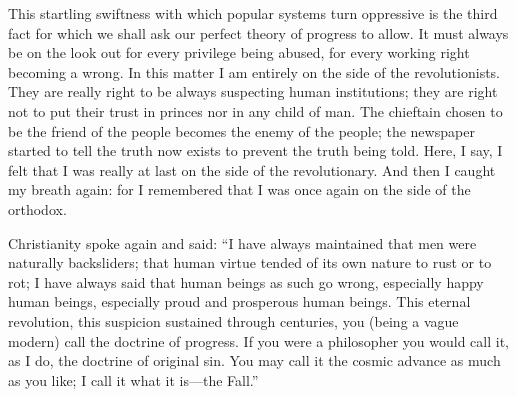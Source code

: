 This startling swiftness with which popular systems turn oppressive is the third fact for which we shall ask our perfect theory of progress to allow. It must always be on the look out for every privilege being abused, for every working right becoming a wrong. In this matter I am entirely on the side of the revolutionists. They are really right to be always suspecting human institutions; they are right not to put their trust in princes nor in any child of man. The chieftain chosen to be the friend of the people becomes the enemy of the people; the newspaper started to tell the truth now exists to prevent the truth being told. Here, I say, I felt that I was really at last on the side of the revolutionary. And then I caught my breath again: for I remembered that I was once again on the side of the orthodox.

Christianity spoke again and said: “I have always maintained that men were naturally backsliders; that human virtue tended of its own nature to rust or to rot; I have always said that human beings as such go wrong, especially happy human beings, especially proud and prosperous human beings. This eternal revolution, this suspicion sustained through centuries, you (being a vague modern) call the doctrine of progress. If you were a philosopher you would call it, as I do, the doctrine of original sin. You may call it the cosmic advance as much as you like; I call it what it is—the Fall.”

